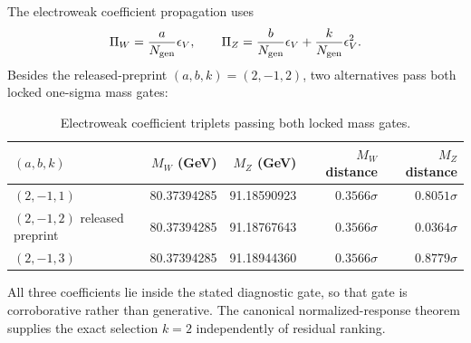 The electroweak coefficient propagation uses
\begin{equation}
 \Pi_W=\frac{a}{N_{\rm gen}}\epsilon_V,\qquad
 \Pi_Z=\frac{b}{N_{\rm gen}}\epsilon_V+
       \frac{k}{N_{\rm gen}}\epsilon_V^2.
\end{equation}
Besides the released-preprint $(a,b,k)=(2,-1,2)$, two alternatives pass both locked one-sigma mass gates:
\begin{table}[H]
\centering
\small
\caption{Electroweak coefficient triplets passing both locked mass gates.}
\label{tab:ew-alternative-diagnostics}
\begin{tabular}{@{}lrrrr@{}}
\toprule
$(a,b,k)$ & $M_W$ (GeV) & $M_Z$ (GeV) & $M_W$ distance & $M_Z$ distance \\
\midrule
$(2,-1,1)$ & 80.37394285 & 91.18590923 & $0.3566\sigma$ & $0.8051\sigma$ \\
$(2,-1,2)$ released preprint & 80.37394285 & 91.18767643 & $0.3566\sigma$ & $0.0364\sigma$ \\
$(2,-1,3)$ & 80.37394285 & 91.18944360 & $0.3566\sigma$ & $0.8779\sigma$ \\
\bottomrule
\end{tabular}
\end{table}

All three coefficients lie inside the stated diagnostic gate, so that gate is corroborative rather than generative.  The canonical normalized-response theorem supplies the exact selection $k=2$ independently of residual ranking.

